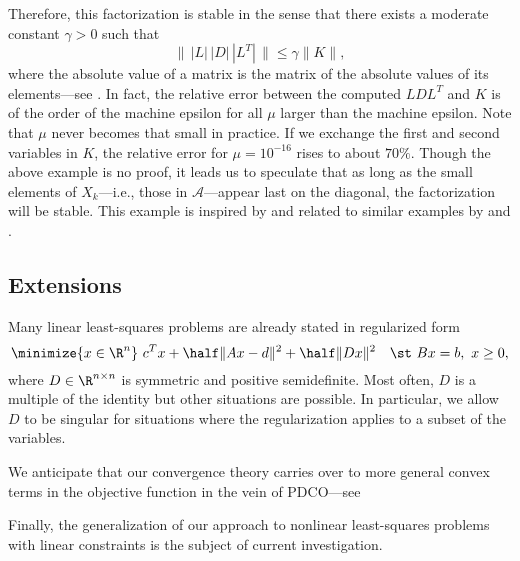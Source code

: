 \documentclass{amsart}
\begin{document}
Therefore, this factorization is stable in the sense that there exists a
moderate constant $\gamma > 0$ such that
\[
  \| \, |L| \, |D| \, |L^T| \, \| \leq \gamma \|K\|,
\]
where the absolute value of a matrix is the matrix of the absolute values of
its elements---see \cite{golub-vanloan-1996}. In fact, the relative error
between the computed $LDL^T$ and $K$ is of the order of the machine epsilon for
all $\mu$ larger than the machine epsilon. Note that $\mu$ never becomes that
small in practice. If we exchange the first and second variables in $K$, the
relative error for $\mu = 10^{-16}$ rises to about $70\%$. Though the above
example is no proof, it leads us to speculate that as long as the small
elements of $X_k$---i.e., those in $\mathcal{A}$---appear last on the diagonal,
the factorization will be stable. This example is inspired by and related to
similar examples by \cite{vanderbei-1995} and
\cite{gill-saunders-shinnerl-1996}.

\subsection{Extensions}

Many linear least-squares problems are already stated in regularized form
\begin{equation}
  \label{eq:reg-lsq}
  \minimize{x \in \R^n} \ c^T x + \half \|Ax - d\|^2 + \half \|Dx\|^2 \quad
  \st \ Bx = b, \ x \geq 0,
\end{equation}
where $D \in \R^{n \times n}$ is symmetric and positive semidefinite. Most
often, $D$ is a multiple of the identity but other situations are possible. In
particular, we allow $D$ to be singular for situations where the regularization
applies to a subset of the variables.

We anticipate that our convergence theory carries over to more general convex
terms in the objective function in the vein  of PDCO---see

Finally, the generalization of our approach to nonlinear least-squares
problems with linear constraints is the subject of current investigation.



\end{document}
